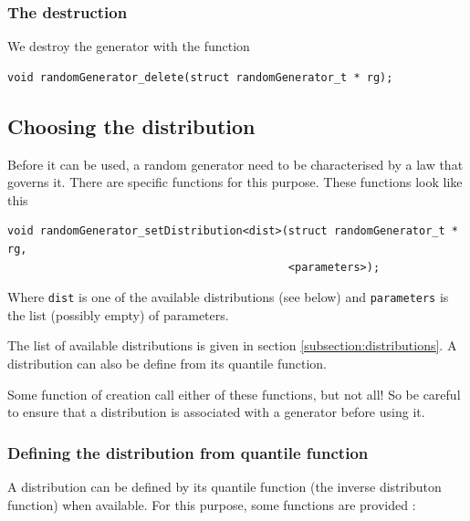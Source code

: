 \subsubsection{The destruction}

   We destroy the generator with the function

\begin{verbatim}
void randomGenerator_delete(struct randomGenerator_t * rg);
\end{verbatim}

%
\subsection{Choosing the distribution}

   Before it can be used, a random generator need to be characterised
by a law that governs it. There are specific functions for this
purpose. These functions look like this

\begin{verbatim}
void randomGenerator_setDistribution<dist>(struct randomGenerator_t * rg,
                                           <parameters>);
\end{verbatim}

   Where \lstinline!dist! is one of the available distributions (see
below) and \lstinline!parameters! is the list (possibly empty) of
parameters.

   The list of available distributions is given in section
\ref{subsection:distributions}. A distribution can also be define
from its quantile function.


   Some function of creation call either of these functions, but not all! 
So be careful to ensure that a distribution is associated with a generator 
before using it.

%
\subsubsection{Defining the distribution from quantile function}

   A distribution can be defined by its quantile function (the inverse
distributon function) when available. For this purpose, some functions
are provided :

